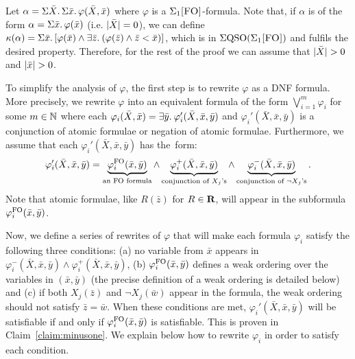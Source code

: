 \medskip

  Let $\alpha =  \Sigma{\bar{X}}.\,\Sigma{\bar{x}}.\, \varphi(\bar{X},\bar{x})$ where $\varphi$ is a $\Sigma_{1}\textsc{[FO]}$-formula.
Note that, if $\alpha$ is of the form $\alpha = \Sigma{\bar{x}}.\, \varphi(\bar{x})$ (i.e. $\vert \bar{X} \vert = 0$), we can define $\kappa(\alpha) = \Sigma{\bar{x}}.\, [\varphi(\bar{x})\wedge \exists{\bar{z}}.\:(\varphi(\bar{z})\wedge\bar{z} < \bar{x})]$, which is in $\Sigma{\rm QSO}(\Sigma_{1}\textsc{[FO]})$ and fulfils the desired property. 
Therefore, for the rest of the proof we can assume that $\vert \bar{X} \vert > 0$ and $\vert \bar{x} \vert > 0$.

To simplify the analysis of $\varphi$, the first step is to rewrite $\varphi$ as a DNF formula. 
More precisely, we rewrite $\varphi$ into an equivalent formula of the form $\bigvee_{i = 1}^m \varphi_i$ for some $m\in \mathbb{N}$ where each $\varphi_i(\bar{X}, \bar{x}) = \exists{\bar{y}}.\: \varphi_i'(\bar{X}, \bar{x}, \bar{y})$ and $\varphi_i'(\bar{X}, \bar{x}, \bar{y})$ is a conjunction of atomic formulae or negation of atomic formulae. Furthermore, we assume that each $\varphi_i'(\bar{X}, \bar{x}, \bar{y})$ has the~form:
$$
\varphi_i'(\bar{X}, \bar{x}, \bar{y}) =  \underbrace{\varphi_i^{{\rm FO}}(\bar{x},\bar{y})}_{\text{an ${\rm FO}$ formula}} \wedge 
\underbrace{\varphi_i^{+}(\bar{X},\bar{x},\bar{y})}_{\text{conjunction of $X_j$'s}} \wedge
\underbrace{\varphi_i^{-}(\bar{X},\bar{x},\bar{y})}_{\text{conjunction of $\neg X_j$'s}}.
$$
Note that atomic formulae, like $R(\bar{z})$ for $R \in \mathbf{R}$, will appear in the subformula $\varphi_i^{{\rm FO}}(\bar{x},\bar{y})$. 

Now, we define a series of rewrites of $\varphi$ that will make each formula $\varphi_i$ satisfy the following three conditions: (a) no variable from $\bar{x}$ appears in $\varphi_i^{-}(\bar{X},\bar{x},\bar{y})\wedge\varphi_i^{+}(\bar{X},\bar{x},\bar{y})$, (b) $\varphi_i^{{\rm FO}}(\bar{x},\bar{y})$ defines a weak ordering over the variables in $(\bar{x},\bar{y})$ (the precise definition of a weak ordering is detailed below) and (c) if both $X_j(\bar{z})$ and $\neg X_j(\bar{w})$ appear in the formula, the weak ordering should not satisfy $\bar{z} = \bar{w}$.
When these conditions are met, $\varphi_i'(\bar{X}, \bar{x}, \bar{y})$ will be satisfiable if and only if $\varphi_i^{{\rm FO}}(\bar{x},\bar{y})$ is satisfiable. This is proven in Claim~\ref{claim:minusone}.
We explain below how to rewrite $\varphi_i$ in order to satisfy each condition.

